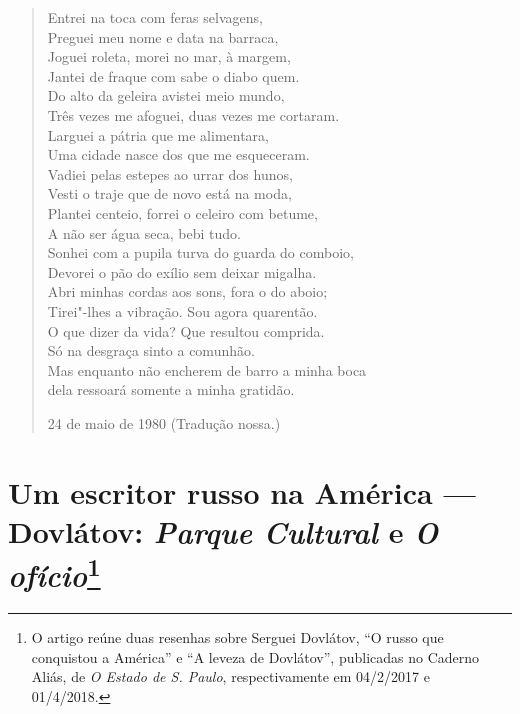 \begin{verse}
Entrei na toca com feras selvagens, \\
Preguei meu nome e data na barraca, \\
Joguei roleta, morei no mar, à margem, \\
Jantei de fraque com sabe o diabo quem. \\[8pt]
Do alto da geleira avistei meio mundo, \\
Três vezes me afoguei, duas vezes me \qb{}cortaram. \\
Larguei a pátria que me alimentara, \\
Uma cidade nasce dos que me esqueceram. \\[8pt]
Vadiei pelas estepes ao urrar dos hunos, \\
Vesti o traje que de novo está na moda, \\
Plantei centeio, forrei o celeiro com betume, \\
A não ser água seca, bebi tudo. \\[8pt]
Sonhei com a pupila turva do guarda do \qb{}comboio, \\
Devorei o pão do exílio sem deixar migalha. \\
Abri minhas cordas aos sons, fora o do aboio; \\
Tirei"-lhes a vibração. Sou agora quarentão. \\[8pt]
O que dizer da vida? Que resultou comprida. \\
Só na desgraça sinto a comunhão. \\
Mas enquanto não encherem de barro a \qb{}minha boca \\
dela ressoará somente a minha gratidão.

24 de maio de 1980 (Tradução nossa.)

\end{verse}


\chapter*{Um escritor russo na América --- Dovlátov: \emph{Parque Cultural} e \emph{O ofício}\footnote{O artigo reúne duas resenhas sobre Serguei Dovlátov, ``O russo que conquistou a América'' e ``A leveza de Dovlátov'', publicadas no Caderno Aliás, de \emph{O Estado de S. Paulo}, respectivamente em 04/2/2017 e 01/4/2018.}}

\label{dovlatov}

